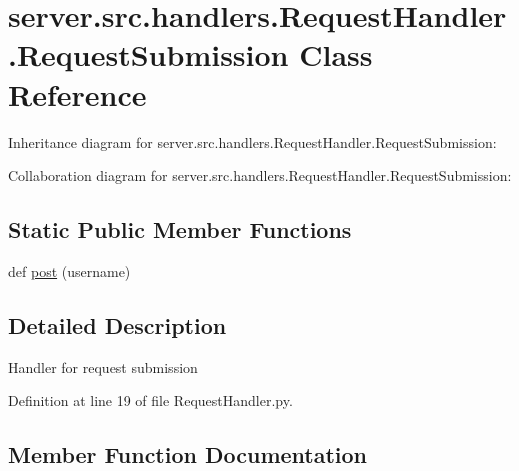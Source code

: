 \hypertarget{classserver_1_1src_1_1handlers_1_1_request_handler_1_1_request_submission}{}\section{server.\+src.\+handlers.\+Request\+Handler.\+Request\+Submission Class Reference}
\label{classserver_1_1src_1_1handlers_1_1_request_handler_1_1_request_submission}


Inheritance diagram for server.\+src.\+handlers.\+Request\+Handler.\+Request\+Submission\+:


Collaboration diagram for server.\+src.\+handlers.\+Request\+Handler.\+Request\+Submission\+:
\subsection*{Static Public Member Functions}
\begin{DoxyCompactItemize}
\item 
def \hyperlink{classserver_1_1src_1_1handlers_1_1_request_handler_1_1_request_submission_abb569d498e2535b9b8d1b747ddff4747}{post} (username)
\end{DoxyCompactItemize}


\subsection{Detailed Description}
\begin{DoxyVerb}Handler for request submission\end{DoxyVerb}
 

Definition at line 19 of file Request\+Handler.\+py.



\subsection{Member Function Documentation}
